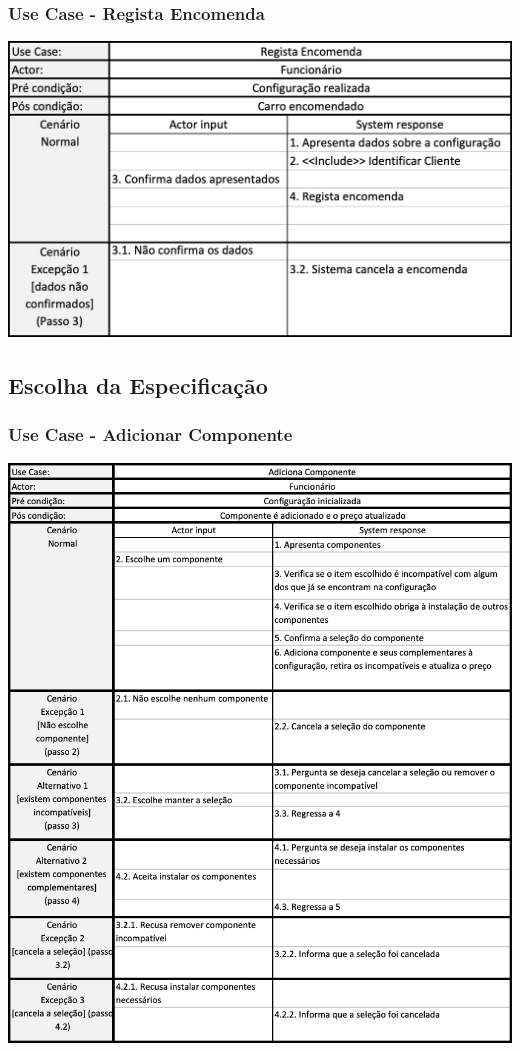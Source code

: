 \subsubsection{Use Case - Regista Encomenda}
\begin{center}
 	\includegraphics[width = 5.5in]{D_E_USECASE/uc_regista_encomenda.png}
\end{center}

\subsection{Escolha da Especificação}

\subsubsection{Use Case - Adicionar Componente}
\begin{center}
 	\includegraphics[width = 5.5in]{D_E_USECASE/uc_adiciona_componente.png}
\end{center}
